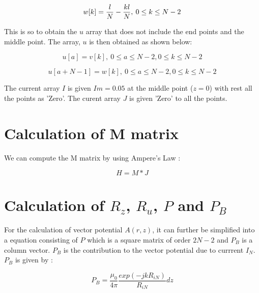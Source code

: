 \documentclass[15pt,a4paper]{article}
\begin{document}
\begin{equation*}
w[k] =  \frac{l}{N} - \frac{kl}{N} ,\>   0\leq k \leq N -2\\\\
\end{equation*}

This is so to obtain the $u$ array that does not include the end points and the middle point. The array, $u$ is then obtained as shown below: 

\begin{equation*}
u[a] =  v[k]  ,\>   0\leq a \leq N -2,  0\leq k \leq N -2
\end{equation*}

\begin{equation*}
u[a+N-1] =  w[k]  ,\>   0\leq a \leq N -2,  0\leq k \leq N -2
\end{equation*}

The current array $I$ is given $Im = 0.05$ at the middle point ($z = 0$) with rest all the points as 'Zero'. The curent array $J$ is given 'Zero' to all the points.


\section{Calculation of M matrix}

We can compute the M matrix by using Ampere's Law : 













\begin{equation*}
H = M*J 
\end{equation*}





\section{Calculation of $R_z$, $R_u$, $P$ and $P_B$}

For the calculation of vector potential $A(r,z)$, it can further be simplified into a equation consisting of $P$ which is a square matrix of order $2N-2$ and $P_B$ is a column vector. $P_B$ is the contribution to the vector potential due to currrent $I_N$.  $P_B$ is given by : 

\begin{equation*}
P_B = \frac{\mu_0}{4\pi} \frac{exp(-jkR_{iN})}{R_{iN}} dz 
\end{equation*}
\end{document}
